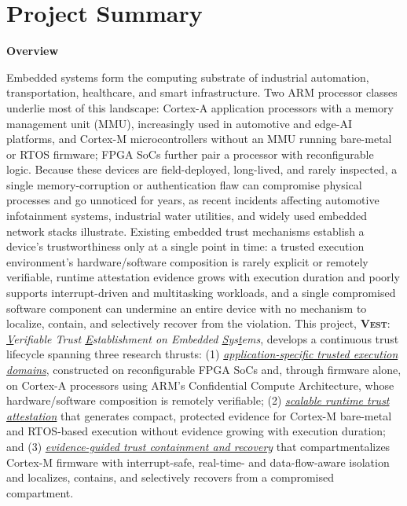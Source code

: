 \documentclass[11pt,onecolumn]{article}
\newcommand{\sys}{\textsc{Vest}\xspace}
\begin{document}
\section*{Project Summary}

\textbf{Overview}

Embedded systems form the computing substrate of industrial automation, transportation, healthcare, and smart infrastructure.
Two ARM processor classes underlie most of this landscape: Cortex-A application processors with a memory management unit (MMU), increasingly used in automotive and edge-AI platforms, and Cortex-M microcontrollers without an MMU running bare-metal or RTOS firmware; FPGA SoCs further pair a processor with reconfigurable logic.
Because these devices are field-deployed, long-lived, and rarely inspected, a single memory-corruption or authentication flaw can compromise physical processes and go unnoticed for years, as recent incidents affecting automotive infotainment systems, industrial water utilities, and widely used embedded network stacks illustrate.
Existing embedded trust mechanisms establish a device's trustworthiness only at a single point in time: a trusted execution environment's hardware/software composition is rarely explicit or remotely verifiable, runtime attestation evidence grows with execution duration and poorly supports interrupt-driven and multitasking workloads, and a single compromised software component can undermine an entire device with no mechanism to localize, contain, and selectively recover from the violation.
This project, \textbf{\sys}: \textit{\underline{V}erifiable Trust \underline{E}stablishment on Embedded \underline{S}ys\underline{t}ems}, develops a continuous trust lifecycle spanning three research thrusts: (1) \emph{\ul{application-specific trusted execution domains}}, constructed on reconfigurable FPGA SoCs and, through firmware alone, on Cortex-A processors using ARM's Confidential Compute Architecture, whose hardware/software composition is remotely verifiable; (2) \emph{\ul{scalable runtime trust attestation}} that generates compact, protected evidence for Cortex-M bare-metal and RTOS-based execution without evidence growing with execution duration; and (3) \emph{\ul{evidence-guided trust containment and recovery}} that compartmentalizes Cortex-M firmware with interrupt-safe, real-time- and data-flow-aware isolation and localizes, contains, and selectively recovers from a compromised compartment.

\vspace{0.4em}
\end{document}

